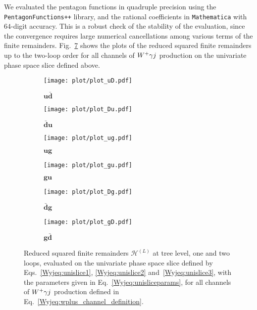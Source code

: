 \documentclass[main.tex]{subfiles}
\begin{document}
We evaluated the pentagon functions in quadruple precision using the \texttt{PentagonFunctions++} library, and the rational coefficients in \texttt{Mathematica} with $64$-digit accuracy.
This is a robust check of the stability of the evaluation, since the convergence requires large numerical cancellations among various terms of the finite remainders. 
Fig.~\ref{Wyjfig:plots} shows the plots of the reduced squared finite remainders up to the two-loop order for all channels of $W^+\gamma j$ production on the univariate phase space slice defined above. 
%
\begin{figure}[t!]
\centering
\begin{subfigure}{.5\textwidth}
    \centering
    \texttt{[image: plot/plot\_uD.pdf]}
    \label{Wyjfig:uD}
    \caption{$\mathbf{u\bar{d}}$}
\end{subfigure}%
\begin{subfigure}{.5\textwidth}
    \centering
    \texttt{[image: plot/plot\_Du.pdf]}
    \label{Wyjfig:Du}
    \caption{$\mathbf{\bar{d}u}$}
\end{subfigure}
\begin{subfigure}{.5\textwidth}
    \centering
    \texttt{[image: plot/plot\_ug.pdf]}
    \label{Wyjfig:ug}
    \caption{$\mathbf{ug}$}
\end{subfigure}%
\begin{subfigure}{.5\textwidth}
    \centering
    \texttt{[image: plot/plot\_gu.pdf]}
    \label{Wyjfig:gu}
    \caption{$\mathbf{gu}$}
\end{subfigure}
\begin{subfigure}{.5\textwidth}
    \centering
    \texttt{[image: plot/plot\_Dg.pdf]}
    \label{Wyjfig:Dg}
    \caption{$\mathbf{\bar{d}g}$}
\end{subfigure}%
\begin{subfigure}{.5\textwidth}
    \centering
    \texttt{[image: plot/plot\_gD.pdf]}
    \label{Wyjfig:gD}
    \caption{$\mathbf{g\bar{d}}$}
\end{subfigure}
\caption[short]{Reduced squared finite remainders $\mathcal{H}^{(L)}$ at tree level, one and two loops, evaluated on the univariate phase space slice defined by Eqs.~\ref{Wyjeq:unislice1}, \ref{Wyjeq:unislice2} and~\ref{Wyjeq:unislice3}, with the parameters given in Eq.~\ref{Wyjeq:unisliceparams}, for all channels of $W^+\gamma j$ production defined in Eq.~\ref{Wyjeq:wplus_channel_definition}.}
\label{Wyjfig:plots}
\end{figure}
\end{document}
